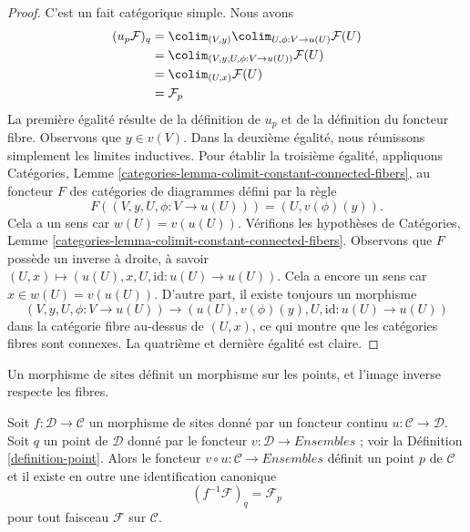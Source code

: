 \begin{proof}
C’est un fait catégorique simple. Nous avons
\begin{align*}
(u_p\mathcal{F})_q
& =
\colim_{(V, y)} \colim_{U, \phi : V \to u(U)} \mathcal{F}(U) \\
& = \colim_{(V, y, U, \phi : V \to u(U))} \mathcal{F}(U) \\
& = \colim_{(U, x)} \mathcal{F}(U) \\
& = \mathcal{F}_p
\end{align*}
La première égalité résulte de la définition de $u_p$ et de la
définition du foncteur fibre. Observons que $y \in v(V)$.
Dans la deuxième égalité, nous réunissons simplement les limites inductives.
Pour établir la troisième égalité, appliquons
Catégories, Lemme \ref{categories-lemma-colimit-constant-connected-fibers},
au foncteur $F$ des catégories de diagrammes défini par la règle
$$
F((V, y, U, \phi : V \to u(U))) = (U, v(\phi)(y)).
$$
Cela a un sens car $w(U) = v(u(U))$. Vérifions les hypothèses de
Catégories, Lemme \ref{categories-lemma-colimit-constant-connected-fibers}.
Observons que $F$ possède un inverse à droite, à savoir
$(U, x) \mapsto (u(U), x, U, \text{id} : u(U) \to u(U))$.
Cela a encore un sens car $x \in w(U) = v(u(U))$. D’autre part,
il existe toujours un morphisme
$$
(V, y, U, \phi : V \to u(U))
\longrightarrow
(u(U), v(\phi)(y), U, \text{id} : u(U) \to u(U))
$$
dans la catégorie fibre au-dessus de $(U, x)$, ce qui montre que les catégories fibres
sont connexes. La quatrième et dernière égalité est claire.
\end{proof}

\begin{lemma}
\label{lemma-point-morphism-sites}
\begin{slogan}
Un morphisme de sites définit un morphisme sur les points, et l’image inverse respecte les fibres.
\end{slogan}
Soit $f : \mathcal{D} \to \mathcal{C}$ un morphisme de sites
donné par un foncteur continu $u : \mathcal{C} \to \mathcal{D}$.
Soit $q$ un point de $\mathcal{D}$ donné par le foncteur
$v : \mathcal{D} \to \textit{Ensembles}$ ; voir la
Définition \ref{definition-point}.
Alors le foncteur $v \circ u : \mathcal{C} \to \textit{Ensembles}$
définit un point $p$ de $\mathcal{C}$ et il existe en outre
une identification canonique
$$
(f^{-1}\mathcal{F})_q = \mathcal{F}_p
$$
pour tout faisceau $\mathcal{F}$ sur $\mathcal{C}$.
\end{lemma}

